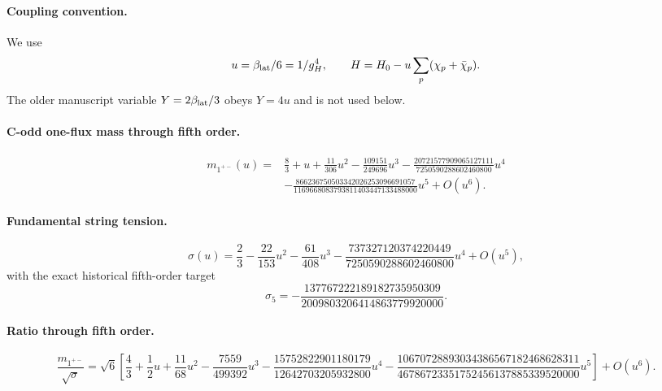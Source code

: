 \paragraph{Coupling convention.}
We use
\[
 u=\beta_{\rm lat}/6=1/g_H^4,
 \qquad H=H_0-u\sum_p(\chi_p+\bar\chi_p).
\]
The older manuscript variable $Y=2\beta_{\rm lat}/3$ obeys $Y=4u$ and is not
used below.

\paragraph{C-odd one-flux mass through fifth order.}
\[
\begin{aligned}
m_{1^{+-}}(u)={}&\frac83+u+\frac{11}{306}u^2
-\frac{109151}{249696}u^3
-\frac{20721577909065127111}{7250590288602460800}u^4\\
&-\frac{866236750503342026253096691057}
{1169668083793811403447133488000}u^5+O(u^6).
\end{aligned}
\]

\paragraph{Fundamental string tension.}
\[
\sigma(u)=\frac23-\frac{22}{153}u^2-\frac{61}{408}u^3
-\frac{737327120374220449}{7250590288602460800}u^4+O(u^5),
\]
with the exact historical fifth-order target
\[
\sigma_5=-\frac{137767222189182735950309}
{2009803206414863779920000}.
\]

\paragraph{Ratio through fifth order.}
\[
\frac{m_{1^{+-}}}{\sqrt\sigma}=\sqrt6\left[
\frac43+\frac12u+\frac{11}{68}u^2-\frac{7559}{499392}u^3
-\frac{15752822901180179}{12642703205932800}u^4
-\frac{10670728893034386567182468628311}
{46786723351752456137885339520000}u^5
\right]+O(u^6).
\]

